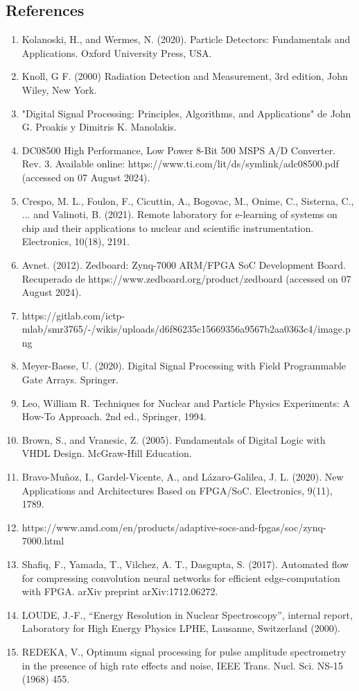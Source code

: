 \documentclass[]{book}
\begin{document}
\subsection*{References}
\begin{enumerate}

    \item Kolanoski, H., and Wermes, N. (2020). Particle Detectors: Fundamentals and Applications. Oxford University Press, USA.
    \item Knoll, G F. (2000) Radiation Detection and Measurement, 3rd edition, John Wiley, New
    York.
    \item "Digital Signal Processing: Principles, Algorithms, and Applications" de John G. Proakis y Dimitris K. Manolakis.
    \item DC08500 High Performance, Low Power 8-Bit 500 MSPS A/D Converter. Rev. 3. Available online: https://www.ti.com/lit/ds/symlink/adc08500.pdf (accessed on 07 August 2024).
    \item Crespo, M. L., Foulon, F., Cicuttin, A., Bogovac, M., Onime, C., Sisterna, C., ... and Valinoti, B. (2021). Remote laboratory for e-learning of systems on chip and their applications to nuclear and scientific instrumentation. Electronics, 10(18), 2191.
    \item Avnet. (2012). Zedboard: Zynq-7000 ARM/FPGA SoC Development Board. Recuperado de https://www.zedboard.org/product/zedboard (accessed on 07 August 2024).
    \item https://gitlab.com/ictp-mlab/smr3765/-/wikis/uploads/d6f86235c15669356a9567b2aa0363c4/image.png
    \item Meyer-Baese, U. (2020). Digital Signal Processing with Field Programmable Gate Arrays. Springer.
    \item Leo, William R. Techniques for Nuclear and Particle Physics Experiments: A How-To Approach. 2nd ed., Springer, 1994.
    \item Brown, S., and Vranesic, Z. (2005). Fundamentals of Digital Logic with VHDL Design. McGraw-Hill Education.
    \item Bravo-Muñoz, I., Gardel-Vicente, A., and Lázaro-Galilea, J. L. (2020). New Applications and Architectures Based on FPGA/SoC. Electronics, 9(11), 1789.
    \item https://www.amd.com/en/products/adaptive-socs-and-fpgas/soc/zynq-7000.html
    \item Shafiq, F., Yamada, T., Vilchez, A. T., Dasgupta, S. (2017). Automated flow for compressing convolution neural networks for efficient edge-computation with FPGA. arXiv preprint arXiv:1712.06272.
    \item LOUDE, J.-F., “Energy Resolution in Nuclear Spectroscopy”, internal report,
    Laboratory for High Energy Physics LPHE, Lausanne, Switzerland (2000).
    \item REDEKA, V., Optimum signal processing for pulse amplitude spectrometry in the
    presence of high rate effects and noise, IEEE Trans. Nucl. Sci. NS-15 (1968) 455.
\end{enumerate}
\end{document}
